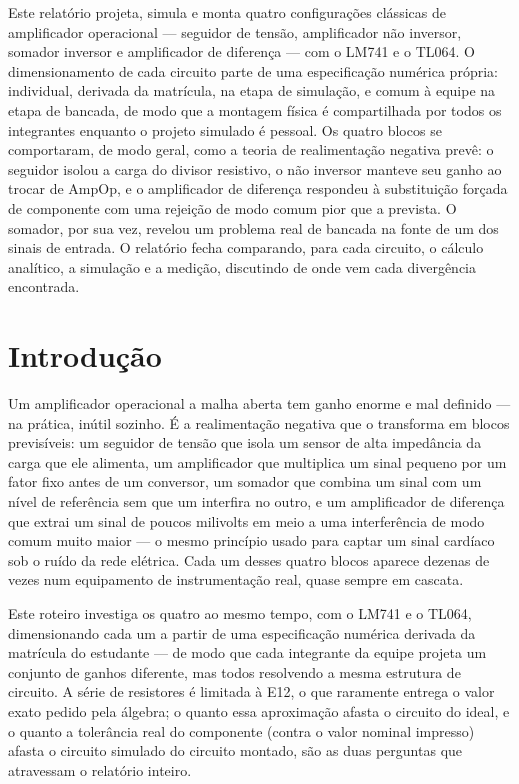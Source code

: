\documentclass[11pt,a4paper]{article}
\begin{document}
\capa

\begin{resumo}
Este relatório projeta, simula e monta quatro configurações clássicas de amplificador
operacional — seguidor de tensão, amplificador não inversor, somador inversor e amplificador
de diferença — com o LM741 e o TL064. O dimensionamento de cada circuito parte de uma
especificação numérica própria: individual, derivada da matrícula, na etapa de simulação, e
comum à equipe na etapa de bancada, de modo que a montagem física é compartilhada por todos os
integrantes enquanto o projeto simulado é pessoal. Os quatro blocos se comportaram, de modo
geral, como a teoria de realimentação negativa prevê: o seguidor isolou a carga do divisor
resistivo, o não inversor manteve seu ganho ao trocar de AmpOp, e o amplificador de diferença
respondeu à substituição forçada de componente com uma rejeição de modo comum pior que a
prevista. O somador, por sua vez, revelou um problema real de bancada na fonte de um dos
sinais de entrada. O relatório fecha comparando, para cada circuito, o cálculo analítico, a
simulação e a medição, discutindo de onde vem cada divergência encontrada.
\end{resumo}

\section{Introdução}

Um amplificador operacional a malha aberta tem ganho enorme e mal definido — na prática,
inútil sozinho. É a realimentação negativa que o transforma em blocos previsíveis: um
seguidor de tensão que isola um sensor de alta impedância da carga que ele alimenta, um
amplificador que multiplica um sinal pequeno por um fator fixo antes de um conversor, um
somador que combina um sinal com um nível de referência sem que um interfira no outro, e um
amplificador de diferença que extrai um sinal de poucos milivolts em meio a uma interferência
de modo comum muito maior — o mesmo princípio usado para captar um sinal cardíaco sob o ruído
da rede elétrica. Cada um desses quatro blocos aparece dezenas de vezes num equipamento de
instrumentação real, quase sempre em cascata.

Este roteiro investiga os quatro ao mesmo tempo, com o LM741 e o TL064, dimensionando cada um
a partir de uma especificação numérica derivada da matrícula do estudante — de modo que cada
integrante da equipe projeta um conjunto de ganhos diferente, mas todos resolvendo a mesma
estrutura de circuito. A série de resistores é limitada à E12, o que raramente entrega o valor
exato pedido pela álgebra; o quanto essa aproximação afasta o circuito do ideal, e o quanto a
tolerância real do componente (contra o valor nominal impresso) afasta o circuito simulado do
circuito montado, são as duas perguntas que atravessam o relatório inteiro.
\end{document}
